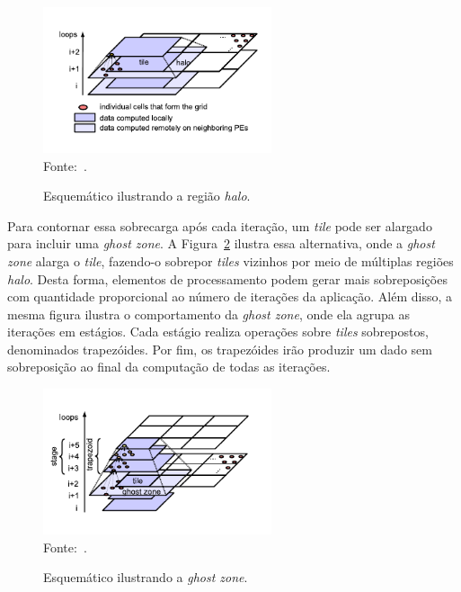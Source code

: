 \begin{figure}[!h]
	\centering
    \caption{Esquemático ilustrando a região \textit{halo}.}
    \includegraphics[width=0.6\textwidth]{figs/tilingHalo.pdf} \\
    Fonte:~\cite{meng11}.
    \label{fig:tilingHalo}
\end{figure}



Para contornar essa sobrecarga após cada iteração, um \textit{tile} pode ser
alargado para incluir uma \textit{ghost zone}. A Figura~\ref{fig:tiling} ilustra
essa alternativa, onde a \textit{ghost zone} alarga o \textit{tile}, fazendo-o
sobrepor \textit{tiles} vizinhos por meio de múltiplas regiões \textit{halo}.
Desta forma, elementos de processamento podem gerar mais sobreposições com quantidade proporcional ao
número de iterações da aplicação. Além disso, a mesma figura ilustra o
comportamento da \textit{ghost zone}, onde ela agrupa as iterações em estágios.
Cada estágio realiza operações sobre \textit{tiles} sobrepostos, denominados
trapezóides. Por fim, os trapezóides irão produzir um dado sem sobreposição ao
final da computação de todas as iterações.

\begin{figure}[!h]
	\centering
    \caption{Esquemático ilustrando a \textit{ghost zone}.}
    \includegraphics[width=0.6\textwidth]{figs/tiling.pdf} \\
    Fonte:~\cite{meng11}.
    \label{fig:tiling}
\end{figure}



